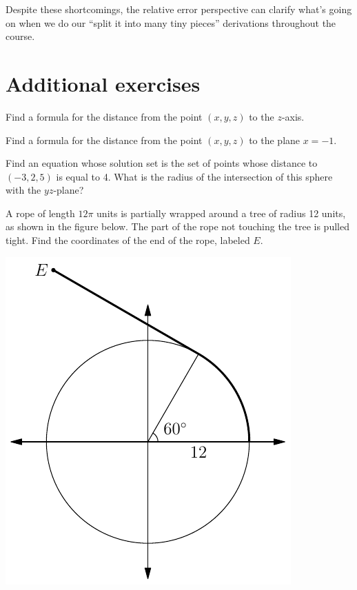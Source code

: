 \documentclass[svgnames]{watsonbook}
\begin{document}
Despite these shortcomings, the relative error perspective can clarify
what's going on when we do our ``split it into many tiny
pieces'' derivations throughout the course. 

\newpage 

\section{Additional exercises} \label{sec:addexer}


\begin{aexercise}
  Find a formula for the distance from the point $(x,y,z)$ to the
  $z$-axis. 
\end{aexercise}

\begin{aexercise}
  Find a formula for the distance from the point $(x,y,z)$ to the
  plane $x = -1$. 
\end{aexercise}

\begin{aexercise}
  Find an equation whose solution set is the set of points whose distance to $(-3,2,5)$
  is equal to 4. What is the radius of the intersection of this sphere with the $yz$-plane?
\end{aexercise}

\begin{aexercise}
  A rope of length $12\pi$ units is partially wrapped around a tree of radius 12 units, as shown in the figure below. The part of the rope not touching the tree is pulled tight. Find the coordinates of the end of the rope, labeled $E$. 
  \begin{center}
    \includegraphics{exercisefigures/ropetree}
  \end{center}
\end{aexercise}
\end{document}
